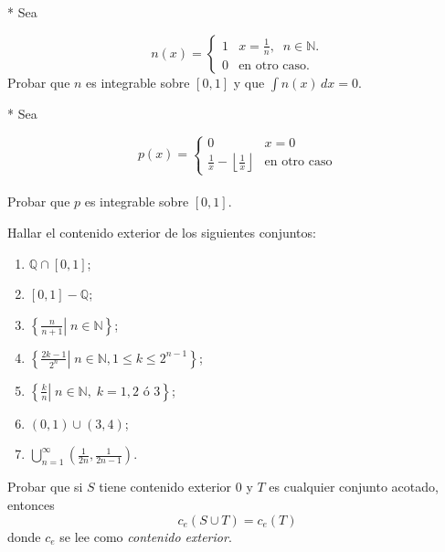 \documentclass{book}
\newcommand{\qq}{\mathbb{Q}}
\newcommand{\nn}{\mathbb{N}}
\begin{document}
\begin{ejer}{}* Sea 

$$n(x)=\left
\{
\begin {array}{ll}
1&x=\frac{1}{n},\;\;n\in \nn.\\
0&\mbox{en otro caso.}
\end{array}
\right.$$
Probar que $n$ es integrable sobre $[0,1]$ y que $\int n(x)\,dx=0$.


\end{ejer}
 
\begin{ejer}{}* Sea 

$$p(x)=\left
\{
\begin {array}{ll}
0&x=0\\
\frac{1}{x}-\left\lfloor \frac{1}{x}\right\rfloor&\mbox{en otro caso}
\end{array}
\right.$$
\\
Probar que $p$ es integrable sobre $[0,1]$.


\end{ejer} 

\begin{ejer}{} Hallar el contenido exterior de los siguientes conjuntos: 
\begin{enumerate}
\item $\qq \cap [0,1]$;
\item $[0,1]-\qq$;
\item $\left\{\frac{n}{n+1}\left. \right|\; n\in\nn\right\}$;
\item $\left\{\frac{2k-1}{2^n}\left. \right|\; n\in\nn, 1\leq k\leq 2^{n-1}\right\}$;
\item $\left\{\frac{k}{n}\left. \right|\; n\in\nn, \;k=1,2 \mbox{ \'o  } 3\right\}$;
\item $(0,1)\cup(3,4)$;
\item $\bigcup\limits_{n=1}^{\infty} \left(\frac{1}{2n},\frac{1}{2n-1}\right)$.
\end{enumerate}


\end{ejer}  

\begin{ejer}{} Probar que si $S$ tiene contenido exterior 0 y $T$ es cualquier conjunto acotado, entonces
\[
c_e(S\cup T)=c_e(T)
\]
donde $c_e$ se lee como \textit{contenido exterior}.

\end{ejer} 
\end{document}
